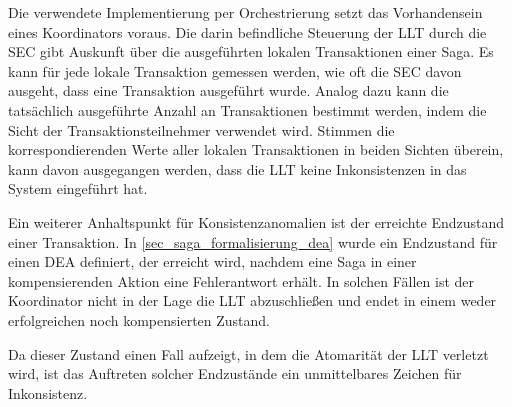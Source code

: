 Die verwendete Implementierung per Orchestrierung setzt das Vorhandensein eines Koordinators voraus. Die darin befindliche Steuerung der LLT durch die SEC gibt Auskunft über die ausgeführten lokalen Transaktionen einer Saga. Es kann für jede lokale Transaktion gemessen werden, wie oft die SEC davon ausgeht, dass eine Transaktion ausgeführt wurde. Analog dazu kann die tatsächlich ausgeführte Anzahl an Transaktionen bestimmt werden, indem die Sicht der Transaktionsteilnehmer verwendet wird. Stimmen die korrespondierenden Werte aller lokalen Transaktionen in beiden Sichten überein, kann davon ausgegangen werden, dass die LLT keine Inkonsistenzen in das System eingeführt hat.

Ein weiterer Anhaltspunkt für Konsistenzanomalien ist der erreichte Endzustand einer Transaktion. In \ref{sec_saga_formalisierung_dea} wurde ein Endzustand für einen DEA definiert, der erreicht wird, nachdem eine Saga in einer kompensierenden Aktion eine Fehlerantwort erhält. In solchen Fällen ist der Koordinator nicht in der Lage die LLT abzuschließen und endet in einem weder erfolgreichen noch kompensierten Zustand. 

Da dieser Zustand einen Fall aufzeigt, in dem die Atomarität der LLT verletzt wird, ist das Auftreten solcher Endzustände ein unmittelbares Zeichen für Inkonsistenz.